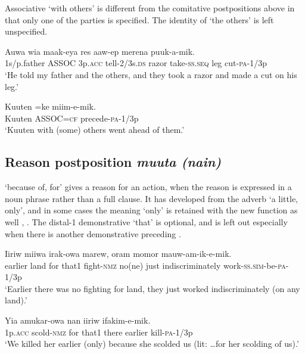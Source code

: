 Associative  `with others' is different from the comitative postpositions above in that only one of the parties is specified. The identity of `the others' is left unspecified.

\ea%
\label{ex:3:x826}
\gll Auwa  wia maak-eya res aaw-ep merena puuk-a-mik.\\
1s/p.father ASSOC 3p.\textsc{acc} tell-2/3s.\textsc{ds} razor take-\textsc{ss}.\textsc{seq} leg cut-\textsc{pa}-1/3p\\
\glt`He told my father and the others, and they took a razor and made a cut on his leg.'
\z

\ea%
\label{ex:3:x827}
\gll Kuuten =ke miim-e-mik. \\
Kuuten ASSOC=\textsc{cf} precede-\textsc{pa}-1/3p\\
\glt`Kuuten with (some) others went ahead of them.'
\z

\subsection{Reason postposition \textit{muuta (nain)}}\label{sec:3:y:x}
{}
 `because of, for' gives a reason for an action, when the reason is expressed in a noun phrase rather than a full clause. It has developed from the adverb  `a little, only', and in some cases the meaning `only' is retained with the new function as well , . The distal-1 demonstrative  `that' is optional, and is left out especially when there is another demonstrative  preceding  .

\ea%
\label{ex:3:x756}
\gll Iiriw miiwa   irak-owa marew, oram momor mauw-am-ik-e-mik.\\
earlier land for that1 fight-\textsc{nmz} no(ne) just indiscriminately work-\textsc{ss}.\textsc{sim}-be-\textsc{pa}-1/3p\\
\glt`Earlier there was no fighting for land, they just worked indiscriminately (on any land).'
\z

\ea%
\label{ex:3:x1876}
\gll Yia amukar-owa   nan iiriw ifakim-e-mik. \\
1p.\textsc{acc} scold-\textsc{nmz} for that1 there earlier kill-\textsc{pa}-1/3p\\
\glt`We killed her earlier (only) because she scolded us (lit: {\dots}for her scolding of us).'
\z


